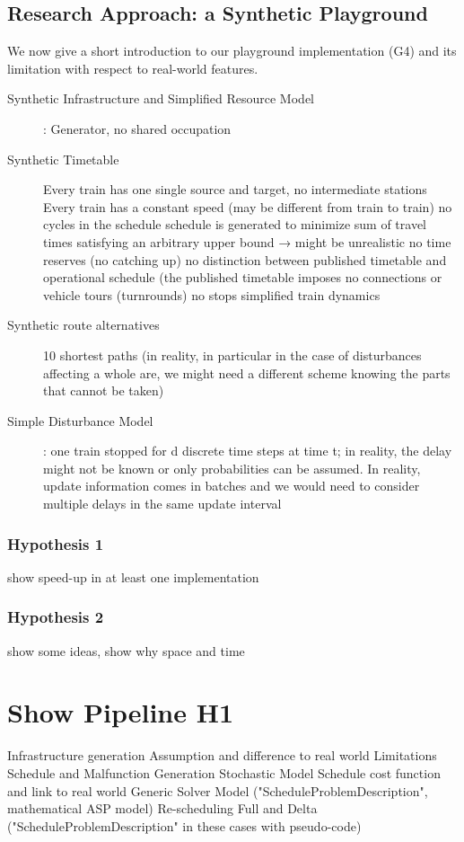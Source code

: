 \documentclass{article}
\begin{document}
\subsection{Research Approach: a Synthetic Playground}
We now give a short introduction to our playground implementation (G4) and its limitation with respect to real-world features.

\begin{description}
\item[Synthetic Infrastructure and Simplified Resource Model] \cite{aicrowdFLATland}
: Generator, no shared occupation
\item[Synthetic Timetable]
        Every train has one single source and target, no intermediate stations
        Every train has a constant speed (may be different from train to train)
        no cycles in the schedule
        schedule is generated to minimize sum of travel times satisfying an arbitrary upper bound → might be unrealistic
        no time reserves (no catching up)
        no distinction between published timetable and operational schedule (the published timetable imposes
        no connections or vehicle tours (turnrounds)
        no stops
        simplified train dynamics
\item[Synthetic route alternatives]
        10 shortest paths (in reality, in particular in the case of disturbances affecting a whole are, we might need a different scheme knowing the parts that cannot be taken)
\item[Simple Disturbance Model]:  one train stopped for d discrete time steps at time t; in reality, the delay might not be known or only probabilities can be assumed.
    In reality, update information comes in batches and we would need to consider multiple delays in the same update interval
\end{description}


\subsubsection{Hypothesis 1}\label{subec:H1}
show speed-up in at least one implementation
\subsubsection{Hypothesis 2}\label{subec:H2}
show some ideas, show why space and time


\section{Show Pipeline H1}
        Infrastructure generation
            Assumption and difference to real world
            Limitations
        Schedule and Malfunction Generation
            Stochastic Model
            Schedule cost function and link to real world
        Generic Solver Model ("ScheduleProblemDescription", mathematical ASP model)
        Re-scheduling Full and Delta ("ScheduleProblemDescription" in these cases with pseudo-code)
\end{document}
